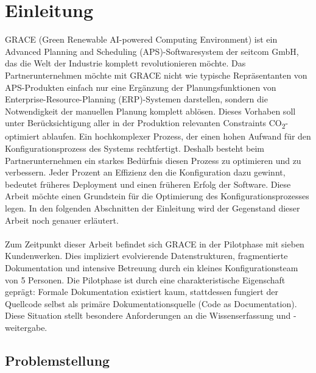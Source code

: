 \section{Einleitung}
\label{sec:Einleitung}


GRACE (Green Renewable AI-powered
Computing Environment) ist ein Advanced Planning and Scheduling (APS)-Softwaresystem der seitcom GmbH, das die Welt der Industrie komplett revolutionieren möchte. Das Partnerunternehmen möchte mit GRACE nicht wie typische Repräsentanten von APS-Produkten einfach nur eine Ergänzung der Planungsfunktionen von Enterprise-Resource-Planning (ERP)-Systemen darstellen, sondern die Notwendigkeit der manuellen Planung komplett ablösen. Dieses Vorhaben soll unter Berücksichtigung aller in der Produktion relevanten Constraints CO\textsubscript{2}-optimiert ablaufen. Ein hochkomplexer Prozess, der einen hohen Aufwand für den Konfigurationsprozess des Systems rechtfertigt. Deshalb besteht beim Partnerunternehmen ein starkes Bedürfnis diesen Prozess zu optimieren und zu verbessern. Jeder Prozent an Effizienz den die Konfiguration dazu gewinnt, bedeutet früheres Deployment und einen früheren Erfolg der Software. Diese Arbeit möchte einen Grundstein für die Optimierung des Konfigurationsprozesses legen. In den folgenden Abschnitten der Einleitung wird der Gegenstand dieser Arbeit noch genauer erläutert.
\\\\
Zum Zeitpunkt dieser Arbeit befindet sich GRACE in der Pilotphase mit sieben Kundenwerken. Dies impliziert evolvierende Datenstrukturen, fragmentierte Dokumentation und intensive Betreuung durch ein kleines Konfigurationsteam von 5 Personen. Die Pilotphase ist durch eine charakteristische Eigenschaft geprägt: Formale Dokumentation existiert kaum, stattdessen fungiert der Quellcode selbst als primäre Dokumentationsquelle (\glqq Code as Documentation\grqq{}). Diese Situation stellt besondere Anforderungen an die Wissenserfassung und -weitergabe.


\subsection{Problemstellung}
\label{subsec:Problemstellung}

